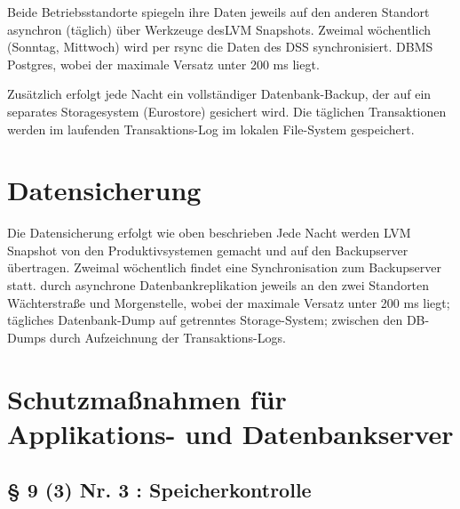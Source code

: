 \documentclass[]{scrreprt}
\begin{document}
Beide Betriebsstandorte spiegeln ihre Daten jeweils auf den anderen Standort asynchron (täglich) über Werkzeuge desLVM Snapshots. Zweimal wöchentlich (Sonntag, Mittwoch) wird per rsync die Daten des DSS synchronisiert.  DBMS Postgres, wobei der maximale Versatz unter 200 ms liegt.

Zusätzlich erfolgt jede Nacht ein vollständiger Datenbank-Backup, der auf ein separates Storagesystem (Eurostore) gesichert wird. Die täglichen Transaktionen werden im laufenden Transaktions-Log im lokalen File-System gespeichert.

\section{Datensicherung}

Die Datensicherung erfolgt wie oben beschrieben 
Jede Nacht werden LVM Snapshot von den Produktivsystemen gemacht und auf den Backupserver übertragen. Zweimal wöchentlich findet eine Synchronisation zum Backupserver statt.
durch asynchrone Datenbankreplikation jeweils an den zwei Standorten Wächterstraße und Morgenstelle, wobei der maximale Versatz unter 200 ms liegt;
tägliches Datenbank-Dump auf getrenntes Storage-System;
zwischen den DB-Dumps durch Aufzeichnung der Transaktions-Logs.

\section{Schutzmaßnahmen für Applikations- und Datenbankserver}

\subsection{§ 9 (3) Nr. 3 : Speicherkontrolle}
\end{document}
